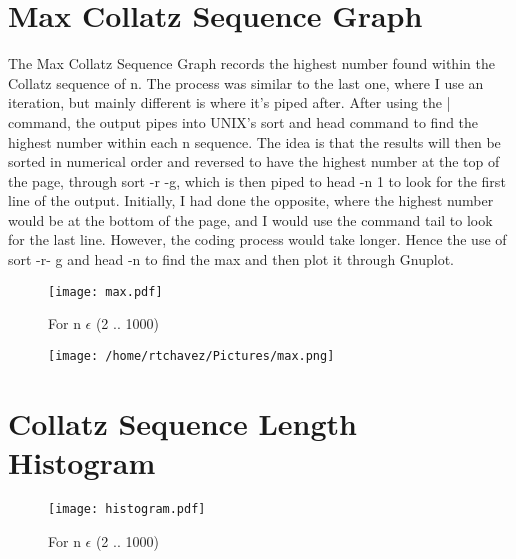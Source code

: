 \documentclass[11pt]{article} %
\begin{document}
\pagebreak
\section*{Max Collatz Sequence Graph}
The Max Collatz Sequence Graph records the highest number found within the Collatz sequence of n. 
The process was similar to the last one, where I use an iteration, but mainly different is where 
it's piped after. After using the | command, the output pipes into UNIX's sort and head command 
to find the highest number within each n sequence. 
The idea is that the results will then be 
sorted in numerical order and reversed to have the highest number at the top of the page, 
through sort -r -g, which is then piped to head -n 1 to look for the first line of the output. 
Initially, I had done the opposite, where the highest number would be at the bottom of the page,
and I would use the command tail to look for the last line. However, the coding process would take 
longer. 
Hence the use of sort -r- g and head -n to find the max and then plot it through Gnuplot.

\begin{figure}
\centering
\texttt{[image: max.pdf]}
\caption{For n $ \epsilon $ (2 .. 1000)}
\label{}
\end{figure}
\pagebreak

\begin{figure}
\centering
\texttt{[image: /home/rtchavez/Pictures/max.png]}
\caption{}
\label{}
\end{figure}
\pagebreak

\section*{Collatz Sequence Length Histogram}
\begin{figure}[htp]
\centering
\texttt{[image: histogram.pdf]}
\caption{For n $ \epsilon $ (2 .. 1000)}
\label{}
\end{figure}
\end{document}
